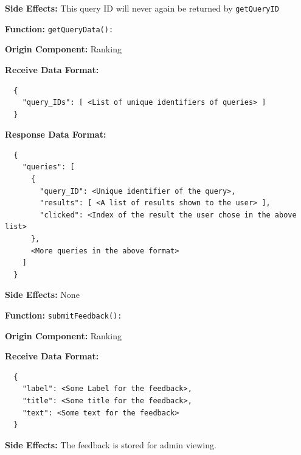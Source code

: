 \textbf{Side Effects:} This query ID will never again be returned by \verb|getQueryID|

\bigskip

\textbf{Function:} \verb|getQueryData():|

\smallskip

\textbf{Origin Component:} Ranking

\smallskip

\textbf{Receive Data Format:} \begin{verbatim}
  {
    "query_IDs": [ <List of unique identifiers of queries> ]
  }
\end{verbatim}

\textbf{Response Data Format:} \begin{verbatim}
  {
    "queries": [
      {
        "query_ID": <Unique identifier of the query>,
        "results": [ <A list of results shown to the user> ],
        "clicked": <Index of the result the user chose in the above list>
      }, 
      <More queries in the above format>
    ]
  }
\end{verbatim}

\smallskip

\textbf{Side Effects:} None

\bigskip

\textbf{Function:} \verb|submitFeedback():|

\smallskip

\textbf{Origin Component:} Ranking

\smallskip

\textbf{Receive Data Format:} \begin{verbatim}
  {
    "label": <Some Label for the feedback>,
    "title": <Some title for the feedback>,
    "text": <Some text for the feedback>
  }
\end{verbatim}

\smallskip

\textbf{Side Effects:} The feedback is stored for admin viewing.

